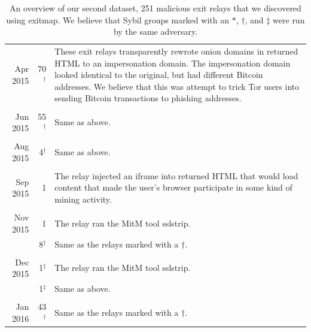 \begin{table}
\begin{tabularx}{\textwidth}{r r X}
Apr 2015 & 70$^\dagger$ & These exit relays transparently rewrote onion domains
in returned HTML to an impersonation domain.  The impersonation domain looked
identical to the original, but had different Bitcoin addresses.  We believe that
this was attempt to trick Tor users into sending Bitcoin transactions to
phishing addresses. \\

& & \\

Jun 2015 & 55$^\dagger$ & Same as above. \\

& & \\

Aug 2015 & 4$^\dagger$ & Same as above. \\

& & \\

Sep 2015 & 1 & The relay injected an iframe into returned HTML that would load
content that made the user's browser participate in some kind of mining
activity. \\

& & \\

Nov 2015 & 1 & The relay ran the MitM tool sslstrip. \\

& 8$^\dagger$ & Same as the relays marked with a $\dagger$. \\

& & \\

Dec 2015 & 1$^\ddagger$ & The relay ran the MitM tool sslstrip. \\

& 1$^\ddagger$ & Same as above. \\

& & \\

Jan 2016 & 43$^\dagger$ & Same as the relays marked with a $\dagger$. \\
\bottomrule
\end{tabularx}
\caption{An overview of our second dataset, 251 malicious exit relays that we
discovered using exitmap.  We believe that Sybil groups marked with an
$*$, $\dagger$, and $\ddagger$ were run by the same adversary.}
\label{tab:exitmap-dataset}
\end{table}

